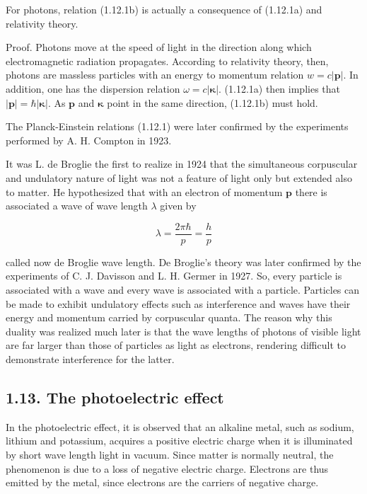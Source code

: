 \documentclass{article}
\begin{document}
For photons, relation (1.12.1b) is actually a consequence of (1.12.1a) and relativity theory.

Proof. Photons move at the speed of light in the direction along which electromagnetic radiation propagates. According to relativity theory, then, photons are massless particles with an energy to momentum relation $w=c|\boldsymbol{p}|$. In addition, one has the dispersion relation $\omega=c|\boldsymbol{\kappa}|$. (1.12.1a) then implies that $|\boldsymbol{p}|=\hbar|\boldsymbol{\kappa}|$. As $\boldsymbol{p}$ and $\boldsymbol{\kappa}$ point in the same direction, (1.12.1b) must hold.

The Planck-Einstein relations (1.12.1) were later confirmed by the experiments performed by A. H. Compton in 1923.

It was L. de Broglie the first to realize in 1924 that the simultaneous corpuscular and undulatory nature of light was not a feature of light only but extended also to matter. He hypothesized that with an electron of momentum $\boldsymbol{p}$ there is associated a wave of wave length $\lambda$ given by
 
\begin{equation*}
\lambda=\frac{2 \pi \hbar}{p}=\frac{h}{p} \tag{1.12.2}
\end{equation*}
 
called now de Broglie wave length. De Broglie's theory was later confirmed by the experiments of C. J. Davisson and L. H. Germer in 1927. So, every particle is associated with a wave and every wave is associated with a particle. Particles
can be made to exhibit undulatory effects such as interference and waves have their energy and momentum carried by corpuscular quanta. The reason why this duality was realized much later is that the wave lengths of photons of visible light are far larger than those of particles as light as electrons, rendering difficult to demonstrate interference for the latter.

\subsection*{1.13. The photoelectric effect}

In the photoelectric effect, it is observed that an alkaline metal, such as sodium, lithium and potassium, acquires a positive electric charge when it is illuminated by short wave length light in vacuum. Since matter is normally neutral, the phenomenon is due to a loss of negative electric charge. Electrons are thus emitted by the metal, since electrons are the carriers of negative charge.
\end{document}
